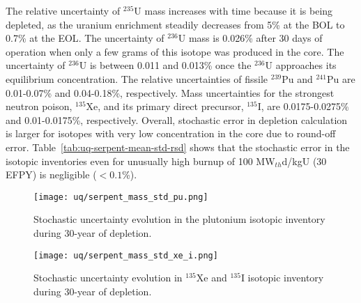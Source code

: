 The relative uncertainty of $^{235}$U mass increases with time because it is 
being depleted, as the uranium enrichment steadily decreases from 5\% at the 
\gls{BOL} to 0.7\% at the \gls{EOL}. The uncertainty of $^{236}$U mass is 
0.026\% after 30 days of operation when only a few grams of this isotope was 
produced in the core. The uncertainty of $^{236}$U is between 0.011  and 
0.013\% once the $^{236}$U approaches its equilibrium concentration. The 
relative uncertainties of fissile $^{239}$Pu and $^{241}$Pu are 0.01-0.07\% 
and 0.04-0.18\%, respectively. Mass uncertainties for the 
strongest neutron poison, $^{135}$Xe, and its primary direct precursor, 
$^{135}$I, are 0.0175-0.0275\% and 0.01-0.0175\%, respectively. Overall, 
stochastic error in depletion calculation is larger for isotopes with very low 
concentration in the core due to round-off error. 
Table~\ref{tab:uq-serpent-mean-std-rsd} shows that the stochastic error in the 
isotopic inventories even for unusually high burnup of 100 MW$_{th}$d/kgU (30 
\gls{EFPY}) is negligible ($<0.1$\%).

\begin{figure}[htp!] %
	\centering
	\texttt{[image: uq/serpent\_mass\_std\_pu.png]}
	\vspace{-3mm}
	\caption{Stochastic uncertainty evolution in the plutonium isotopic 
		inventory during 30-year of depletion.}
	\label{fig:uq-serpent-pu}
\end{figure}
	\vspace{-9mm}
\begin{figure}[hbp!] %
	\centering
	\texttt{[image: uq/serpent\_mass\_std\_xe\_i.png]}
		\vspace{-3mm}
	\caption{Stochastic uncertainty evolution in $^{135}$Xe and $^{135}$I 
	isotopic inventory during 30-year of depletion.}
	\label{fig:uq-serpent-xe-i}
\end{figure}


